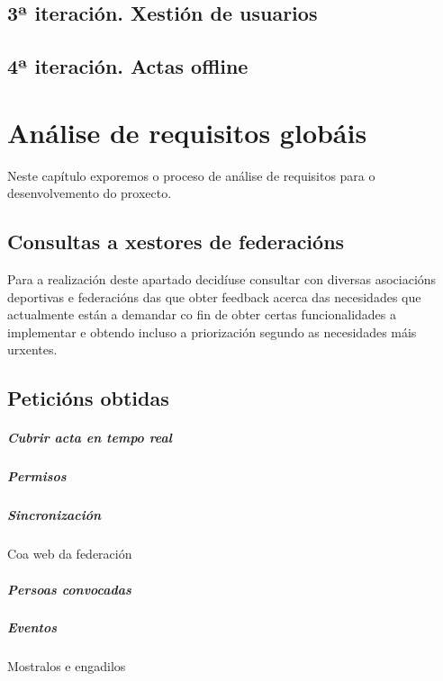 \documentclass[a4paper,spanish,10p,titlepage]{report}
\begin{document}
  \section{3ª iteración. Xestión de usuarios}
  \section{4ª iteración. Actas offline}

\clearpage


\chapter{Análise de requisitos globáis}

  Neste capítulo exporemos o proceso de análise de requisitos para o desenvolvemento do 
proxecto.

  \section{Consultas a xestores de federacións}
  Para a realización deste apartado decidíuse consultar con diversas asociacións 
deportivas e federacións das que obter feedback acerca das necesidades que 
actualmente están a demandar co fin de obter certas funcionalidades a implementar e 
obtendo incluso a priorización segundo as necesidades máis urxentes.


  \section{Peticións obtidas}
  
  \paragraph{Cubrir acta en tempo real}
  \paragraph{Permisos}
  \paragraph{Sincronización} Coa web da federación
  \paragraph{Persoas convocadas}
  \paragraph{Eventos} Mostralos e engadilos
\end{document}
